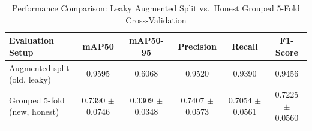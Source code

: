 \begin{table}[htbp]
\caption{Performance Comparison: Leaky Augmented Split vs.\ Honest Grouped 5-Fold Cross-Validation}
\label{tab:baseline_comparison}
\centering
\begin{tabular}{lccccc}
\hline
\textbf{Evaluation Setup} & \textbf{mAP50} & \textbf{mAP50-95} & \textbf{Precision} & \textbf{Recall} & \textbf{F1-Score} \\
\hline
Augmented-split (old, leaky) & 0.9595 & 0.6068 & 0.9520 & 0.9390 & 0.9456 \\
Grouped 5-fold (new, honest) & 0.7390 $\pm$ 0.0746 & 0.3309 $\pm$ 0.0348 & 0.7407 $\pm$ 0.0573 & 0.7054 $\pm$ 0.0561 & 0.7225 $\pm$ 0.0560 \\
\hline
\end{tabular}
\end{table}
